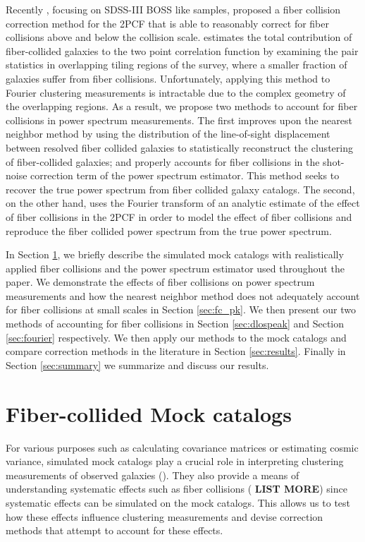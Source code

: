 \documentclass{emulateapj}
\begin{document}
Recently \cite{Guo:2012aa}, focusing on SDSS-III BOSS like samples, proposed a fiber collision correction method for the 2PCF that is able to reasonably correct for fiber collisions above and below the collision scale. \cite{Guo:2012aa} estimates the total contribution of fiber-collided galaxies to the two point correlation function by examining the pair statistics in overlapping tiling regions of the survey, where a smaller fraction of galaxies suffer from fiber collisions. Unfortunately, applying this method to Fourier clustering measurements is intractable due to the complex geometry of the overlapping regions. As a result, we propose two methods to account for fiber collisions in power spectrum measurements. The first improves upon the nearest neighbor method by using the distribution of the line-of-sight displacement between resolved fiber collided galaxies to statistically reconstruct the clustering of fiber-collided galaxies; and properly accounts for fiber collisions in the shot-noise correction term of the power spectrum estimator. This method seeks to recover the true power spectrum from fiber collided galaxy catalogs. The second, on the other hand, uses the Fourier transform of an analytic estimate of the effect of fiber collisions in the 2PCF in order to model the effect of fiber collisions and reproduce the fiber collided power spectrum from the true power spectrum.

In Section \ref{sec:catalog}, we briefly describe the simulated mock catalogs with realistically applied fiber collisions and the power spectrum estimator used throughout the paper. We demonstrate the effects of fiber collisions on power spectrum measurements and how the nearest neighbor method does not adequately account for fiber collisions at small scales in Section \ref{sec:fc_pk}. We then present our two methods of accounting for fiber collisions in Section \ref{sec:dlospeak} and Section \ref{sec:fourier} respectively. We then apply our methods to the mock catalogs and compare correction methods in the literature in Section \ref{sec:results}. Finally in Section \ref{sec:summary} we summarize and discuss our results. 

\section{Fiber-collided Mock catalogs} \label{sec:catalog}
For various purposes such as calculating covariance matrices or estimating cosmic variance, simulated mock catalogs play a crucial role in interpreting clustering measurements of observed galaxies (\citealt{Scoccimarro:2002aa, Anderson:2012aa, Manera:2013aa}). They also provide a means of understanding systematic effects such as fiber collisions (\citealt{Guo:2012aa, Manera:2013aa} {\bf LIST MORE}) since systematic effects can be simulated on the mock catalogs. This allows us to test how these effects influence clustering measurements and devise correction methods that attempt to account for these effects.
\end{document}
